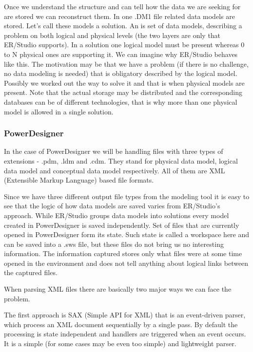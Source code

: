 Once we understand the structure and can tell how the data we are seeking for are stored we can reconstruct them.
In one .DM1 file related data models are stored. Let's call these models a solution. An  is set of data models, describing a problem on both logical and physical levels (the two layers are only that ER/Studio supports). In a solution one logical model must be present whereas 0 to N physical ones are supporting it. 
We can imagine why ER/Studio behaves like this. The motivation may be that we have a problem (if there is no challenge, no data modeling is needed) that is obligatory described by the logical model. Possibly we worked out the way to solve it and that is when physical models are present. 
Note that the actual storage may be distributed and the corresponding databases can be of different technologies, that is why more than one physical model is allowed in a single solution.

\subsubsection{PowerDesigner}

In the case of PowerDesigner we will be handling files with three types of extensions - .pdm, .ldm and .cdm. They  stand for physical data model, logical data model and conceptual data model respectively.
All of them are XML (Extensible Markup Language) based file formats. 

Since we have three different output file types from the modeling tool it is easy to see that the logic of how data models are saved varies from ER/Studio's approach. 
While ER/Studio groups data models into solutions every model created in PowerDesigner is saved independently. Set of files that are currently opened in PowerDesigner form its state. Such state is called a workspace here and can be saved into a .sws file, but these files do not bring us no interesting information. The information captured stores only what files were at some time opened in the environment and does not tell anything about logical links between the captured files.

When parsing XML files there are basically two major ways we can face the problem.

The first approach is SAX (Simple API for XML) that is an event-driven parser, which process an XML document sequentially by a single pass. By default the processing is state independent and handlers are triggered when an event occurs. It is a simple (for some cases may be even too simple) and lightweight parser.

